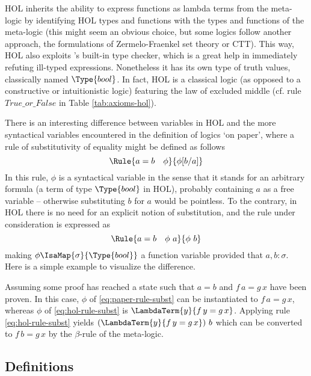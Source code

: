 HOL inherits the ability to express functions as lambda terms from the
meta-logic by identifying HOL types and functions with the types and functions
of the meta-logic (this might seem an obvious choice, but some logics follow
another approach, \EG the formulations of Zermelo-Fraenkel set theory or CTT).
This way, HOL also exploits \Isabelle's built-in type checker, which is a great
help in immediately refuting ill-typed expressions. Nonetheless it has its own
type of truth values, classically named $\Type{bool}$. In fact, HOL is a
classical logic (as opposed to a constructive or intuitionistic logic) featuring
the law of excluded middle (cf. rule $\mathit{True\_or\_False}$ in Table
\ref{tab:axioms-hol}).

There is an interesting difference between variables in HOL and the more
syntactical variables encountered in the definition of logics `on paper', where
a rule of substitutivity of equality might be defined as follows
\begin{equation}
\label{eq:paper-rule-subst}
\Rule{a = b\quad \phi}{\phi[b/a]}
\end{equation}
In this rule, $\phi$ is a syntactical variable in the sense that it stands for an
arbitrary formula (\IE a term of type $\Type{bool}$ in HOL), probably containing
$a$ as a free variable -- otherwise  substituting $b$ for $a$ would be
pointless. To the contrary, in HOL there is no need for an explicit notion of
substitution, and the rule under consideration is expressed as
\begin{equation}
\label{eq:hol-rule-subst}
\Rule{a = b \quad \phi\ a}{\phi\ b}
\end{equation}
making $\phi\IsaMap{\sigma}{\Type{bool}}$ a function variable provided that $a, b : \sigma$. 
Here is a simple example to visualize the difference.
\begin{expl}
  Assuming some proof has reached a state such that $a = b$ and $f\,a = g\,x$
  have been proven. In this case, $\phi$ of \eqref{eq:paper-rule-subst} can be
  instantiated to $f\,a = g\,x$, whereas $\phi$ of \eqref{eq:hol-rule-subst} is
  $\LambdaTerm{y}{f\,y = g\,x}$. Applying rule \eqref{eq:hol-rule-subst} yields
  $(\LambdaTerm{y}{f\,y = g\,x})\ b$ which can be converted to $f\,b = g\,x$ by
  the $\beta$-rule of the meta-logic.
\end{expl}



\subsection{Definitions}
\label{sec:hol-definitions}

